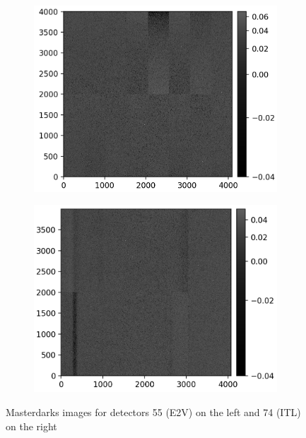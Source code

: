 \begin{figure}[!htb]
     \centering
     \begin{subfigure}[b]{0.49\textwidth}
         \centering
         \includegraphics[width=\textwidth]{Figures/Super_dark_55.png}
     \end{subfigure}
     \hfill
     \begin{subfigure}[b]{0.49\textwidth}
         \centering
         \includegraphics[width=\textwidth]{Figures/Super_dark_74.png}
     \end{subfigure}
        \caption{Masterdarks images for detectors 55 (E2V) on the left and 74 (ITL) on the right}
        \label{fig:superdark}
\end{figure}


